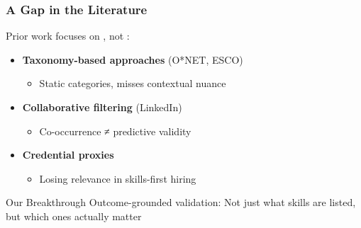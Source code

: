 \documentclass[aspectratio=169]{beamer}
\begin{document}
\begin{frame}
\frametitle{A Gap in the Literature}

Prior work focuses on , not :

\begin{itemize}
\item \textbf{Taxonomy-based approaches} (O*NET, ESCO)
  \begin{itemize}
  \item Static categories, misses contextual nuance
  \end{itemize}
\vspace{0.5em}

\item \textbf{Collaborative filtering} (LinkedIn)
  \begin{itemize}
  \item Co-occurrence ≠ predictive validity
  \end{itemize}
\vspace{0.5em}

\item \textbf{Credential proxies}
  \begin{itemize}
  \item Losing relevance in skills-first hiring
  \end{itemize}
\end{itemize}

\begin{block}{Our Breakthrough}
Outcome-grounded validation: 
Not just what skills are listed, but which ones actually matter
\end{block}
\end{frame}
\end{document}

